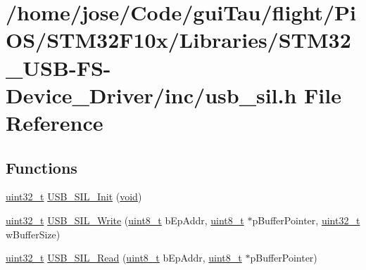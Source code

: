 \hypertarget{_s_t_m32_f10x_2_libraries_2_s_t_m32___u_s_b-_f_s-_device___driver_2inc_2usb__sil_8h}{\section{/home/jose/\-Code/gui\-Tau/flight/\-Pi\-O\-S/\-S\-T\-M32\-F10x/\-Libraries/\-S\-T\-M32\-\_\-\-U\-S\-B-\/\-F\-S-\/\-Device\-\_\-\-Driver/inc/usb\-\_\-sil.h File Reference}
\label{_s_t_m32_f10x_2_libraries_2_s_t_m32___u_s_b-_f_s-_device___driver_2inc_2usb__sil_8h}
}
\subsection*{Functions}
\begin{DoxyCompactItemize}
\item 
\hyperlink{stdint_8h_a435d1572bf3f880d55459d9805097f62}{uint32\-\_\-t} \hyperlink{_s_t_m32_f10x_2_libraries_2_s_t_m32___u_s_b-_f_s-_device___driver_2inc_2usb__sil_8h_a35769edfa7e5e32034d0c65440369cda}{U\-S\-B\-\_\-\-S\-I\-L\-\_\-\-Init} (\hyperlink{group___n_a_m_e_ga18028b8badbf1ea7e704ccac3c488e82}{void})
\item 
\hyperlink{stdint_8h_a435d1572bf3f880d55459d9805097f62}{uint32\-\_\-t} \hyperlink{_s_t_m32_f10x_2_libraries_2_s_t_m32___u_s_b-_f_s-_device___driver_2inc_2usb__sil_8h_ab005324bdedc235ce1f65121467b2e72}{U\-S\-B\-\_\-\-S\-I\-L\-\_\-\-Write} (\hyperlink{stdint_8h_aba7bc1797add20fe3efdf37ced1182c5}{uint8\-\_\-t} b\-Ep\-Addr, \hyperlink{stdint_8h_aba7bc1797add20fe3efdf37ced1182c5}{uint8\-\_\-t} $\ast$p\-Buffer\-Pointer, \hyperlink{stdint_8h_a435d1572bf3f880d55459d9805097f62}{uint32\-\_\-t} w\-Buffer\-Size)
\item 
\hyperlink{stdint_8h_a435d1572bf3f880d55459d9805097f62}{uint32\-\_\-t} \hyperlink{_s_t_m32_f10x_2_libraries_2_s_t_m32___u_s_b-_f_s-_device___driver_2inc_2usb__sil_8h_ab6600b124ff88cf2690b842424888629}{U\-S\-B\-\_\-\-S\-I\-L\-\_\-\-Read} (\hyperlink{stdint_8h_aba7bc1797add20fe3efdf37ced1182c5}{uint8\-\_\-t} b\-Ep\-Addr, \hyperlink{stdint_8h_aba7bc1797add20fe3efdf37ced1182c5}{uint8\-\_\-t} $\ast$p\-Buffer\-Pointer)
\end{DoxyCompactItemize}


